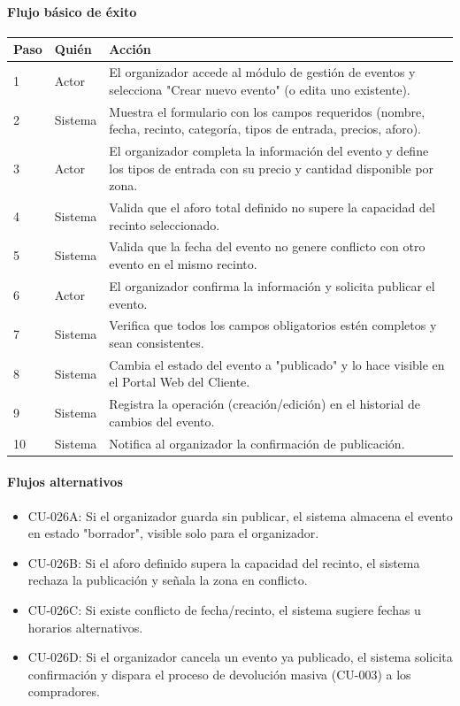 \paragraph{Flujo básico de éxito}
\begin{longtable}{P{1.1cm}P{1.8cm}P{10.5cm}}
\toprule
\textbf{Paso} & \textbf{Quién} & \textbf{Acción}\\
\midrule
{} & Actor & El organizador accede al módulo de gestión de eventos y selecciona "Crear nuevo evento" (o edita uno existente).\\
2 & Sistema & Muestra el formulario con los campos requeridos (nombre, fecha, recinto, categoría, tipos de entrada, precios, aforo).\\
3 & Actor & El organizador completa la información del evento y define los tipos de entrada con su precio y cantidad disponible por zona.\\
4 & Sistema & Valida que el aforo total definido no supere la capacidad del recinto seleccionado.\\
5 & Sistema & Valida que la fecha del evento no genere conflicto con otro evento en el mismo recinto.\\
6 & Actor & El organizador confirma la información y solicita publicar el evento.\\
7 & Sistema & Verifica que todos los campos obligatorios estén completos y sean consistentes.\\
8 & Sistema & Cambia el estado del evento a "publicado" y lo hace visible en el Portal Web del Cliente.\\
9 & Sistema & Registra la operación (creación/edición) en el historial de cambios del evento.\\
10 & Sistema & Notifica al organizador la confirmación de publicación.\\
\bottomrule
\end{longtable}

\paragraph{Flujos alternativos}
\begin{itemize}[leftmargin=1.4em, topsep=1pt]
  \item CU-026A: Si el organizador guarda sin publicar, el sistema almacena el evento en estado "borrador", visible solo para el organizador.
  \item CU-026B: Si el aforo definido supera la capacidad del recinto, el sistema rechaza la publicación y señala la zona en conflicto.
  \item CU-026C: Si existe conflicto de fecha/recinto, el sistema sugiere fechas u horarios alternativos.
  \item CU-026D: Si el organizador cancela un evento ya publicado, el sistema solicita confirmación y dispara el proceso de devolución masiva (CU-003) a los compradores.
\end{itemize}

